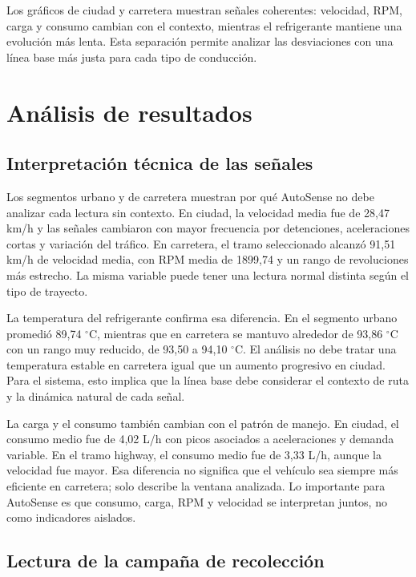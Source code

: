 \documentclass[12pt,letterpaper]{report}
\begin{document}
Los gráficos de ciudad y carretera muestran señales coherentes: velocidad, RPM, carga y consumo cambian con el contexto, mientras el refrigerante mantiene una evolución más lenta. Esta separación permite analizar las desviaciones con una línea base más justa para cada tipo de conducción.

\section{Análisis de resultados}

\subsection{Interpretación técnica de las señales}

Los segmentos urbano y de carretera muestran por qué AutoSense no debe analizar cada lectura sin contexto. En ciudad, la velocidad media fue de 28,47 km/h y las señales cambiaron con mayor frecuencia por detenciones, aceleraciones cortas y variación del tráfico. En carretera, el tramo seleccionado alcanzó 91,51 km/h de velocidad media, con RPM media de 1899,74 y un rango de revoluciones más estrecho. La misma variable puede tener una lectura normal distinta según el tipo de trayecto.

La temperatura del refrigerante confirma esa diferencia. En el segmento urbano promedió 89,74 $^\circ$C, mientras que en carretera se mantuvo alrededor de 93,86 $^\circ$C con un rango muy reducido, de 93,50 a 94,10 $^\circ$C. El análisis no debe tratar una temperatura estable en carretera igual que un aumento progresivo en ciudad. Para el sistema, esto implica que la línea base debe considerar el contexto de ruta y la dinámica natural de cada señal.

La carga y el consumo también cambian con el patrón de manejo. En ciudad, el consumo medio fue de 4,02 L/h con picos asociados a aceleraciones y demanda variable. En el tramo highway, el consumo medio fue de 3,33 L/h, aunque la velocidad fue mayor. Esa diferencia no significa que el vehículo sea siempre más eficiente en carretera; solo describe la ventana analizada. Lo importante para AutoSense es que consumo, carga, RPM y velocidad se interpretan juntos, no como indicadores aislados.

\subsection{Lectura de la campaña de recolección}
\end{document}
